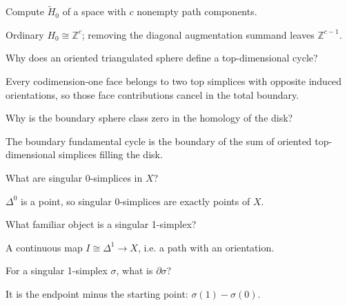\begin{problem}\label{prob:viii17-05}
Compute \(\widetilde H_0\) of a space with \(c\) nonempty path components.
\end{problem}
\begin{solution}
Ordinary \(H_0\cong\mathbb Z^c\); removing the diagonal augmentation summand leaves \(\mathbb Z^{c-1}\).
\end{solution}

\begin{problem}\label{prob:viii17-06}
Why does an oriented triangulated sphere define a top-dimensional cycle?
\end{problem}
\begin{solution}
Every codimension-one face belongs to two top simplices with opposite induced orientations, so those face contributions cancel in the total boundary.
\end{solution}

\begin{problem}\label{prob:viii17-07}
Why is the boundary sphere class zero in the homology of the disk?
\end{problem}
\begin{solution}
The boundary fundamental cycle is the boundary of the sum of oriented top-dimensional simplices filling the disk.
\end{solution}

\begin{problem}\label{prob:viii17-08}
What are singular 0-simplices in \(X\)?
\end{problem}
\begin{solution}
\(\Delta^0\) is a point, so singular 0-simplices are exactly points of \(X\).
\end{solution}

\begin{problem}\label{prob:viii17-09}
What familiar object is a singular 1-simplex?
\end{problem}
\begin{solution}
A continuous map \(I\cong\Delta^1\to X\), i.e. a path with an orientation.
\end{solution}

\begin{problem}\label{prob:viii17-10}
For a singular 1-simplex \(\sigma\), what is \(\partial\sigma\)?
\end{problem}
\begin{solution}
It is the endpoint minus the starting point: \(\sigma(1)-\sigma(0)\).
\end{solution}

